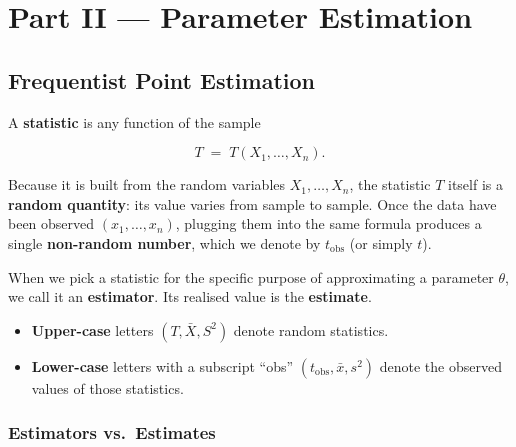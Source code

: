\documentclass[
  letterpaper,
  DIV=11,
  numbers=noendperiod]{scrreprt}
\providecommand{\tightlist}{%
  \setlength{\itemsep}{0pt}\setlength{\parskip}{0pt}}
\theoremstyle{definition}
\theoremstyle{plain}
\theoremstyle{definition}
\theoremstyle{remark}
\begin{document}
\part{Part II --- Parameter Estimation}

\chapter{Frequentist Point
Estimation}\label{frequentist-point-estimation}

A \textbf{statistic} is any function of the sample

\[
T \;=\; T(X_1,\dots,X_n).
\]

Because it is built from the random variables \(X_1,\dots,X_n\), the
statistic \(T\) itself is a \textbf{random quantity}: its value varies
from sample to sample. Once the data have been observed
\((x_1,\dots,x_n)\), plugging them into the same formula produces a
single \textbf{non-random number}, which we denote by
\(t_{\mathrm{obs}}\) (or simply \(t\)).

When we pick a statistic for the specific purpose of approximating a
parameter \(\theta\), we call it an \textbf{estimator}. Its realised
value is the \textbf{estimate}.

\begin{tcolorbox}[enhanced jigsaw, left=2mm, toprule=.15mm, breakable, opacityback=0, titlerule=0mm, toptitle=1mm, colbacktitle=quarto-callout-tip-color!10!white, colframe=quarto-callout-tip-color-frame, coltitle=black, rightrule=.15mm, leftrule=.75mm, bottomrule=.15mm, arc=.35mm, bottomtitle=1mm, title=\textcolor{quarto-callout-tip-color}{\faLightbulb}\hspace{0.5em}{Notation rule}, colback=white, opacitybacktitle=0.6]

\begin{itemize}
\tightlist
\item
  \textbf{Upper-case} letters \((T, \bar X, S^2)\) denote random
  statistics.\\
\item
  \textbf{Lower-case} letters with a subscript ``obs''
  \((t_{\mathrm{obs}}, \bar x, s^2)\) denote the observed values of
  those statistics.
\end{itemize}

\end{tcolorbox}

\section{Estimators vs.~Estimates}\label{estimators-vs.-estimates}
\end{document}
